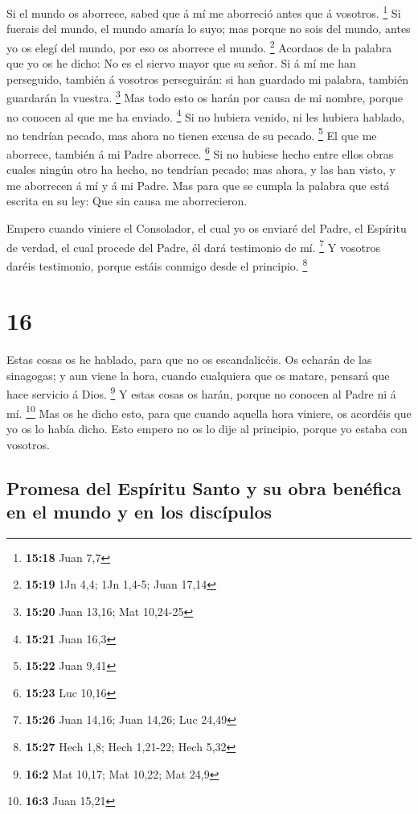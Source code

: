  Si el mundo os aborrece, sabed que á mí me aborreció
antes que á vosotros. \footnote{\textbf{15:18} Juan 7,7} 
Si fuerais del mundo, el mundo amaría lo suyo; mas porque no sois del
mundo, antes yo os elegí del mundo, por eso os aborrece el mundo.
\footnote{\textbf{15:19} 1Jn 4,4; 1Jn 1,4-5; Juan 17,14} 
Acordaos de la palabra que yo os he dicho: No es el siervo mayor que su
señor. Si á mí me han perseguido, también á vosotros perseguirán: si han
guardado mi palabra, también guardarán la vuestra. \footnote{\textbf{15:20}
  Juan 13,16; Mat 10,24-25}  Mas todo esto os harán por
causa de mi nombre, porque no conocen al que me ha enviado. \footnote{\textbf{15:21}
  Juan 16,3}  Si no hubiera venido, ni les hubiera
hablado, no tendrían pecado, mas ahora no tienen excusa de su pecado.
\footnote{\textbf{15:22} Juan 9,41}  El que me aborrece,
también á mi Padre aborrece. \footnote{\textbf{15:23} Luc 10,16}
 Si no hubiese hecho entre ellos obras cuales ningún otro
ha hecho, no tendrían pecado; mas ahora, y las han visto, y me aborrecen
á mí y á mi Padre.  Mas para que se cumpla la palabra que
está escrita en su ley: Que sin causa me aborrecieron.

 Empero cuando viniere el Consolador, el cual yo os
enviaré del Padre, el Espíritu de verdad, el cual procede del Padre, él
dará testimonio de mí. \footnote{\textbf{15:26} Juan 14,16; Juan 14,26;
  Luc 24,49}  Y vosotros daréis testimonio, porque estáis
conmigo desde el principio. \footnote{\textbf{15:27} Hech 1,8; Hech
  1,21-22; Hech 5,32}

\hypertarget{section-15}{%
\section{16}\label{section-15}}

 Estas cosas os he hablado, para que no os escandalicéis.
 Os echarán de las sinagogas; y aun viene la hora, cuando
cualquiera que os matare, pensará que hace servicio á Dios. \footnote{\textbf{16:2}
  Mat 10,17; Mat 10,22; Mat 24,9}  Y estas cosas os harán,
porque no conocen al Padre ni á mí. \footnote{\textbf{16:3} Juan 15,21}
 Mas os he dicho esto, para que cuando aquella hora
viniere, os acordéis que yo os lo había dicho. Esto empero no os lo dije
al principio, porque yo estaba con vosotros.

\hypertarget{promesa-del-espuxedritu-santo-y-su-obra-benuxe9fica-en-el-mundo-y-en-los-discuxedpulos}{%
\subsection{Promesa del Espíritu Santo y su obra benéfica en el mundo y
en los
discípulos}\label{promesa-del-espuxedritu-santo-y-su-obra-benuxe9fica-en-el-mundo-y-en-los-discuxedpulos}}

